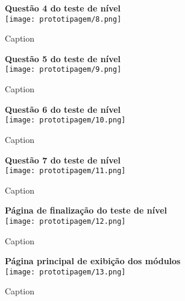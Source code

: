 \documentclass[
	article,			%
	12pt,				%
	oneside,			%
	a4paper,			%
	english,			%
	brazil,				%
	sumario=tradicional
	]{abntex2}
\begin{document}
\begin{apendicesenv}
\begin{figure}[!htbp]
    \centering
    \begin{minipage}{1\linewidth}
        \centering
        {\textbf{Questão 4 do teste de nível}}\\[2mm]
        \texttt{[image: prototipagem/8.png]}
        \caption{Caption}
        \label{fig:prototipagem8}
    \end{minipage}
    \hfill
    \begin{minipage}{1\linewidth}
        \centering
        {\textbf{Questão 5 do teste de nível}}\\[2mm]
        \texttt{[image: prototipagem/9.png]}
        \caption{Caption}
        \label{fig:prototipagem9}
    \end{minipage}
\end{figure}

\begin{figure}[!htbp]
    \centering
    \begin{minipage}{1\linewidth}
        \centering
        {\textbf{Questão 6 do teste de nível}}\\[2mm]
        \texttt{[image: prototipagem/10.png]}
        \caption{Caption}
        \label{fig:prototipagem10}
    \end{minipage}
    \hfill
    \begin{minipage}{1\linewidth}
        \centering
        {\textbf{Questão 7 do teste de nível}}\\[2mm]
        \texttt{[image: prototipagem/11.png]}
        \caption{Caption}
        \label{fig:prototipagem11}
    \end{minipage}
\end{figure}

\begin{figure}[!htbp]
    \centering
    \begin{minipage}{1\linewidth}
        \centering
        {\textbf{Página de finalização do teste de nível}}\\[2mm]
        \texttt{[image: prototipagem/12.png]}
        \caption{Caption}
        \label{fig:prototipagem12}
    \end{minipage}
    \hfill
    \begin{minipage}{1\linewidth}
        \centering
        {\textbf{Página principal de exibição dos módulos}}\\[2mm]
        \texttt{[image: prototipagem/13.png]}
        \caption{Caption}
        \label{fig:prototipagem13}
    \end{minipage}
\end{figure}


\end{apendicesenv}
\end{document}
